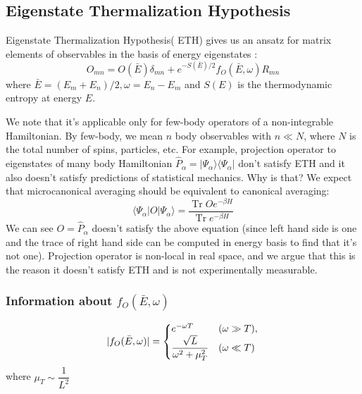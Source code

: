 \documentclass[11pt,a4paper]{article}
\DeclareMathOperator{\Tr}{Tr}
\begin{document}
\subsection{Eigenstate Thermalization Hypothesis}
Eigenstate Thermalization Hypothesis( ETH) gives us an ansatz for matrix elements of observables in the basis of energy eigenstates  \cite{d2016quantum}:
\begin{equation}
O_{mn}= O( \bar{E}) \delta_{mn} + e^{-S(\bar{E})/2} f_O(\bar{E}, \omega) R_{mn}
\end{equation}
where $\bar{E}= (E_m +E_n)/2, \omega= E_n- E_m$ and $S(E)$ is the thermodynamic entropy at energy $E$.

We note that it's applicable only for few-body operators of a non-integrable Hamiltonian. By few-body, we mean $n$ body observables with $n \ll N$, where $N$ is the total number of spins, particles, etc. For example, projection operator to eigenstates of many body  Hamiltonian $\hat{P}_{\alpha}= |\Psi_{\alpha} \rangle \langle\Psi_{\alpha}  |$ don't satisfy ETH and it also doesn't satisfy predictions of statistical mechanics. Why is that? We expect that microcanonical averaging should be equivalent to canonical averaging:
\begin{equation}
 \langle\Psi_{\alpha}  |O|\Psi_{\alpha} \rangle= \dfrac{\Tr O e^{-\beta H}}{\Tr e^{-\beta H}}
\end{equation}
We can see $O= \hat{P}_{\alpha}$ doesn't satisfy the above equation (since left hand side is one and the trace of right hand side can be computed in energy basis to find that it's not one). Projection operator is non-local in real space, and we argue that this is the reason it doesn't satisfy ETH and is not experimentally measurable.

\subsubsection{Information about $f_O(\bar{E}, \omega)$}

\begin{equation}
 |f_O(\bar{E}, \omega)|=\left\{
  \begin{array}{@{}ll@{}}
    e^{-\omega T} & (\omega \gg T), \\
     \dfrac{\sqrt{L}}{\omega^2+ \mu_T^2} & (\omega \ll T)
  \end{array}\right.
\end{equation}
where $\mu_T \sim \dfrac{1}{L^2}$ \cite{khatami2013fluctuation, srednicki1999approach,d2016quantum}
\end{document}
